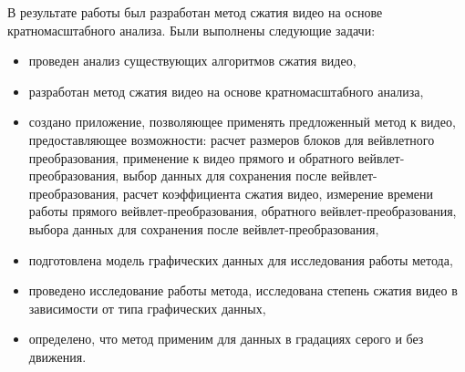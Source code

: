 \Conclusion %

В результате работы был разработан метод сжатия видео на основе
кратномасштабного анализа.
Были выполнены следующие задачи:
\begin{itemize}

\item проведен анализ существующих алгоритмов сжатия видео,
\item разработан метод сжатия видео на основе кратномасштабного анализа,
\item создано приложение, позволяющее применять предложенный метод к видео, 
предоставляющее возможности: расчет размеров блоков для вейвлетного преобразования, 
применение к видео прямого и обратного вейвлет-преобразования, выбор данных 
для сохранения после вейвлет-преобразования, расчет коэффициента сжатия видео, 
измерение времени работы прямого вейвлет-преобразования, обратного вейвлет-преобразования, 
выбора данных для сохранения после вейвлет-преобразования,
\item подготовлена модель графических данных для исследования работы метода,
\item проведено исследование работы метода, исследована степень сжатия видео в зависимости от типа графических данных,
\item определено, что метод применим для данных в градациях серого и без движения.
\end{itemize}


